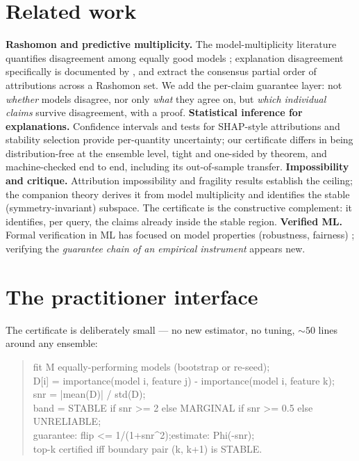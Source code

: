 \documentclass[10pt]{article}
\begin{document}
\section{Related work}
\label{sec:related}

\textbf{Rashomon and predictive multiplicity.} The model-multiplicity literature
quantifies disagreement among equally good models
\citep{breiman2001statistical,fisher2019models,semenova2022existence,marx2024uncertainty,rudin2024amazing};
explanation disagreement specifically is documented by
\citet{krishna2022disagreement}, and \citet{laberge2023partial} extract the consensus
partial order of attributions across a Rashomon set. We add the per-claim guarantee
layer: not \emph{whether} models disagree, nor only \emph{what} they agree on, but
\emph{which individual claims} survive disagreement, with a proof.
\textbf{Statistical inference for explanations.} Confidence intervals and tests for
SHAP-style attributions
\citep{watson2023testing,zhang2026statistical,jin2025probabilistic,hwang2025shap} and
stability selection \citep{meinshausen2010stability} provide per-quantity uncertainty;
our certificate differs in being distribution-free at the ensemble level, tight and
one-sided by theorem, and machine-checked end to end, including its out-of-sample
transfer. \textbf{Impossibility and critique.} Attribution impossibility and fragility
results \citep{bilodeau2024impossibility,sundararajan2020many,kumar2020problems,%
ghorbani2019interpretation,adebayo2018sanity,slack2020fooling} establish the ceiling;
the companion theory \citep{caraker2026limits,caraker2026dash} derives it from model
multiplicity and identifies the stable (symmetry-invariant) subspace. The certificate is
the constructive complement: it identifies, per query, the claims already inside the
stable region. \textbf{Verified ML.} Formal verification in ML has focused on model
properties (robustness, fairness) \citep{decker2024provably,noguer2025mathematical};
verifying the \emph{guarantee chain of an empirical instrument} appears new.

\section{The practitioner interface}
\label{sec:practice}

The certificate is deliberately small --- no new estimator, no tuning, ${\sim}50$ lines
around any ensemble:

\begin{quote}\small\ttfamily
fit M equally-performing models (bootstrap or re-seed);\\
D[i] = importance(model i, feature j) - importance(model i, feature k);\\
snr = |mean(D)| / std(D);\\
band = STABLE if snr >= 2 else MARGINAL if snr >= 0.5 else UNRELIABLE;\\
guarantee: flip <= 1/(1+snr\^{}2);\quad estimate: Phi(-snr);\\
top-k certified iff boundary pair (k, k+1) is STABLE.
\end{quote}
\end{document}
